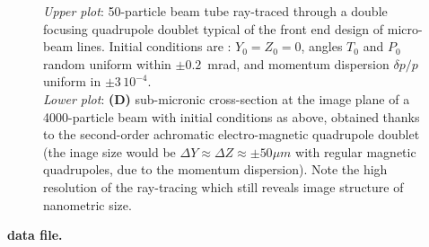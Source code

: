 \begin{figure}[H]
  \caption[FigC71]{\label{figC71} %
  \textit{Upper plot}: 50-particle beam tube ray-traced through a double focusing quadrupole 
doublet typical of the front end design of micro-beam lines. Initial conditions are : 
$Y_0 = Z_0 = 0$, angles $T_0$ and $P_0$ random uniform within $\pm0.2$~mrad, and momentum 
dispersion $\delta p/p$ uniform in $\pm 3\, 10^{-4}$. \\ %
\textit{Lower plot}: \textbf{(D)} sub-micronic cross-section at the image plane of 
a 4000-particle beam with initial conditions as above, obtained thanks to the second-order 
achromatic electro-magnetic quadrupole doublet (the inage size would be $\Delta Y \approx 
\Delta Z \approx \pm 50 \mu m$ with regular magnetic quadrupoles, due to 
the momentum dispersion). Note the high resolution 
of the ray-tracing which still reveals image structure of nanometric size.
  }
\end{figure}
\vfill 

\clearpage
\noindent \textbf{\zgoubi data file.}

